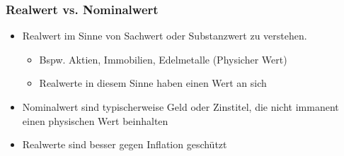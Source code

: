 \documentclass[12pt]{report}
\theoremstyle{dotless}
\theoremstyle{definition}
\begin{document}
\subsubsection{Realwert vs. Nominalwert}
\begin{itemize}
\item Realwert im Sinne von Sachwert oder Substanzwert zu verstehen.
\begin{itemize}
\item Bspw. Aktien, Immobilien, Edelmetalle (Physicher Wert)
\item Realwerte in diesem Sinne haben einen Wert an sich
\end{itemize}
\item Nominalwert sind typischerweise Geld oder Zinstitel, die nicht immanent einen physischen Wert beinhalten
\item Realwerte sind besser gegen Inflation geschützt
\end{itemize}
\end{document}
